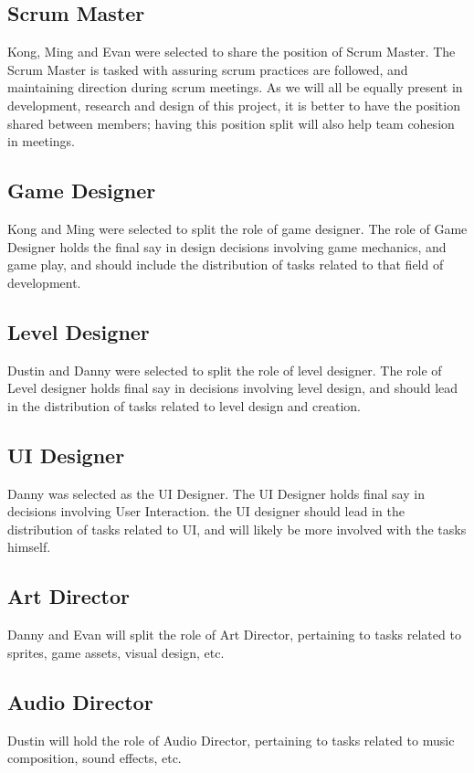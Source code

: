 \documentclass{article}
\begin{document}
\subsection{Scrum Master}
Kong, Ming and Evan were selected to share the position of Scrum Master. The Scrum Master is tasked with assuring scrum practices are followed, and maintaining direction during scrum meetings. As we will all be equally present in development, research and design of this project, it is better to have the position shared between members; having this position split will also help team cohesion in meetings. 
\subsection{Game Designer}
Kong and Ming were selected to split the role of game designer. The role of Game Designer holds the final say in design decisions involving game mechanics, and game play, and should include the distribution of tasks related to that field of development.
\subsection{Level Designer}
Dustin and Danny were selected to split the role of level designer. The role of Level designer holds final say in decisions involving level design, and should lead in the distribution of tasks related to level design and creation.
\subsection{UI Designer}
Danny was selected as the UI Designer. The UI Designer holds final say in decisions involving User Interaction. the UI designer should lead in the distribution of tasks related to UI, and will likely be more involved with the tasks himself. 
\subsection{Art Director}
Danny and Evan will split the role of Art Director, pertaining to tasks related to sprites, game assets, visual design, etc.
\subsection{Audio Director}
Dustin will hold the role of Audio Director, pertaining to tasks related to music composition, sound effects, etc.
\end{document}
